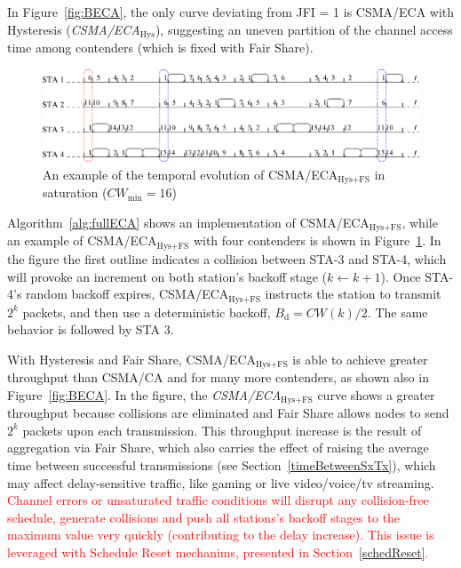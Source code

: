 	
	In Figure~\ref{fig:BECA}, the only curve deviating from JFI = 1 is CSMA/ECA with Hysteresis (\emph{CSMA/ECA$_{\text{Hys}}$}), suggesting an uneven partition of the channel access time among contenders (which is fixed with Fair Share).
	
	\begin{figure}[tb]
	\centering
		\includegraphics[width=0.8\linewidth]{figures/csma_eca_different_backoff_short.eps}
		\caption{An example of the temporal evolution of CSMA/ECA$_{\text{Hys+FS}}$ in saturation ($CW_{\min}=16$)}
		\label{fig:ECA+Hyst}
	\end{figure}
	
	Algorithm~\ref{alg:fullECA} shows an implementation of CSMA/ECA$_{\text{Hys+FS}}$, while an example of CSMA/ECA$_{\text{Hys+FS}}$ with four contenders is shown in  Figure~\ref{fig:ECA+Hyst}. In the figure the first outline indicates a collision between STA-3 and STA-4, which will provoke an increment on both station's backoff stage ($k\leftarrow k+1$). Once STA-4's random backoff expires, CSMA/ECA$_{\text{Hys+FS}}$ instructs the station to transmit $2^{k}$ packets, and then use a deterministic backoff, $B_{\text{d}}=CW(k)/2$. The same behavior is followed by STA 3.
	
	With Hysteresis and Fair Share, CSMA/ECA$_{\text{Hys+FS}}$ is able to achieve greater throughput than CSMA/CA and for many more contenders, as shown also in Figure~\ref{fig:BECA}. In the figure, the \emph{CSMA/ECA$_{\text{Hys+FS}}$} curve shows a greater throughput because collisions are eliminated and Fair Share allows nodes to send $2^{k}$ packets upon each transmission. This throughput increase is the result of aggregation via Fair Share, which also carries the effect of raising the average time between successful transmissions (see Section~\ref{timeBetweenSxTx}), which may affect delay-sensitive traffic, like gaming or live video/voice/tv streaming. \textcolor{red}{Channel errors or unsaturated traffic conditions will disrupt any collision-free schedule, generate collisions and push all stations's backoff stages to the maximum value very quickly (contributing to the delay increase). This issue is leveraged with Schedule Reset mechanims, presented in Section~\ref{schedReset}.}

